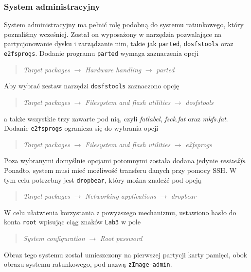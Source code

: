 \documentclass[10pt,a4paper]{article}
\begin{document}
\subsubsection{System administracyjny}
System administracyjny ma pełnić rolę podobną do systemu ratunkowego, który poznaliśmy wcześniej. Został on wyposażony w narzędzia pozwalające na partycjonowanie dysku i zarządzanie nim, takie jak \texttt{parted}, \texttt{dosfstools} oraz \texttt{e2fsprogs}. Dodanie programu \texttt{parted} wymaga zaznaczenia opcji
\begin{quote}
	\textit{Target packages} $\rightarrow$ \textit{Hardware handling} $\rightarrow$ \textit{parted}
\end{quote}
Aby wybrać zestaw narzędzi \texttt{dosfstools} zaznaczono opcję
\begin{quote}
	\textit{Target packages} $\rightarrow$ \textit{Filesystem and flash utilities} $\rightarrow$ \textit{dosfstools}
\end{quote}
a także wszystkie trzy zawarte pod nią, czyli \textit{fatlabel}, \textit{fsck.fat} oraz \textit{mkfs.fat}. Dodanie \texttt{e2fsprogs} ogranicza się do wybrania opcji
\begin{quote}
	\textit{Target packages} $\rightarrow$ \textit{Filesystem and flash utilities} $\rightarrow$ \textit{e2fsprogs}
\end{quote}
Poza wybranymi domyślnie opcjami potomnymi została dodana jedynie \textit{resize2fs}. Ponadto, system musi mieć możliwość transferu danych przy pomocy SSH. W tym celu potrzebny jest \texttt{dropbear}, który można znaleźć pod opcją
\begin{quote}
	\textit{Target packages} $\rightarrow$ \textit{Networking applications} $\rightarrow$ \textit{dropbear}
\end{quote}
W celu ułatwienia korzystania z powyższego mechanizmu, ustawiono hasło do konta \texttt{root} wpisując ciąg znaków \texttt{Lab3} w pole
\begin{quote}
\textit{System configuration} $\rightarrow$ \textit{Root password}
\end{quote}
Obraz tego systemu został umieszczony na pierwszej partycji karty pamięci, obok obrazu systemu ratunkowego, pod nazwą \texttt{zImage-admin}.
\end{document}
